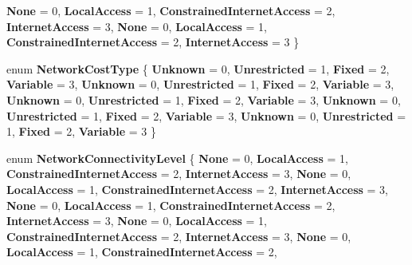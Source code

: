 \begin{DoxyCompactItemize}
\newline
{\bfseries None} = 0, 
{\bfseries Local\+Access} = 1, 
{\bfseries Constrained\+Internet\+Access} = 2, 
{\bfseries Internet\+Access} = 3, 
\newline
{\bfseries None} = 0, 
{\bfseries Local\+Access} = 1, 
{\bfseries Constrained\+Internet\+Access} = 2, 
{\bfseries Internet\+Access} = 3
 \}
\item 
\mbox{\label{namespace_windows_1_1_networking_1_1_connectivity_a1588bce4ba10673fae3a14c52de8ceb8}} 
enum {\bfseries Network\+Cost\+Type} \{ \newline
{\bfseries Unknown} = 0, 
{\bfseries Unrestricted} = 1, 
{\bfseries Fixed} = 2, 
{\bfseries Variable} = 3, 
\newline
{\bfseries Unknown} = 0, 
{\bfseries Unrestricted} = 1, 
{\bfseries Fixed} = 2, 
{\bfseries Variable} = 3, 
\newline
{\bfseries Unknown} = 0, 
{\bfseries Unrestricted} = 1, 
{\bfseries Fixed} = 2, 
{\bfseries Variable} = 3, 
\newline
{\bfseries Unknown} = 0, 
{\bfseries Unrestricted} = 1, 
{\bfseries Fixed} = 2, 
{\bfseries Variable} = 3, 
\newline
{\bfseries Unknown} = 0, 
{\bfseries Unrestricted} = 1, 
{\bfseries Fixed} = 2, 
{\bfseries Variable} = 3
 \}
\item 
\mbox{\label{namespace_windows_1_1_networking_1_1_connectivity_a2c33b149aa0f99f8a20a09851e23f36a}} 
enum {\bfseries Network\+Connectivity\+Level} \{ \newline
{\bfseries None} = 0, 
{\bfseries Local\+Access} = 1, 
{\bfseries Constrained\+Internet\+Access} = 2, 
{\bfseries Internet\+Access} = 3, 
\newline
{\bfseries None} = 0, 
{\bfseries Local\+Access} = 1, 
{\bfseries Constrained\+Internet\+Access} = 2, 
{\bfseries Internet\+Access} = 3, 
\newline
{\bfseries None} = 0, 
{\bfseries Local\+Access} = 1, 
{\bfseries Constrained\+Internet\+Access} = 2, 
{\bfseries Internet\+Access} = 3, 
\newline
{\bfseries None} = 0, 
{\bfseries Local\+Access} = 1, 
{\bfseries Constrained\+Internet\+Access} = 2, 
{\bfseries Internet\+Access} = 3, 
\newline
{\bfseries None} = 0, 
{\bfseries Local\+Access} = 1, 
{\bfseries Constrained\+Internet\+Access} = 2, 

\end{DoxyCompactItemize}
